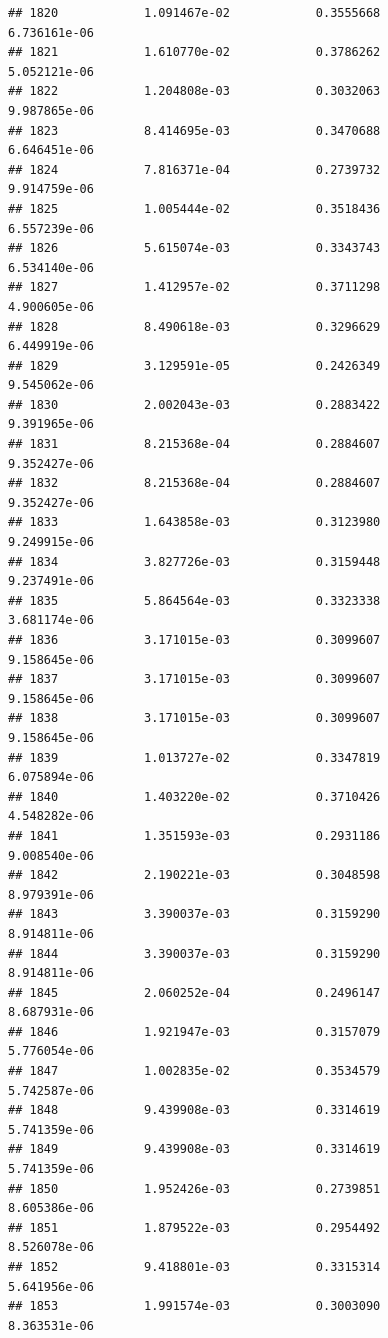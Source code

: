 \documentclass[
]{article}
\begin{document}
\begin{verbatim}
## 1820            1.091467e-02            0.3555668            6.736161e-06
## 1821            1.610770e-02            0.3786262            5.052121e-06
## 1822            1.204808e-03            0.3032063            9.987865e-06
## 1823            8.414695e-03            0.3470688            6.646451e-06
## 1824            7.816371e-04            0.2739732            9.914759e-06
## 1825            1.005444e-02            0.3518436            6.557239e-06
## 1826            5.615074e-03            0.3343743            6.534140e-06
## 1827            1.412957e-02            0.3711298            4.900605e-06
## 1828            8.490618e-03            0.3296629            6.449919e-06
## 1829            3.129591e-05            0.2426349            9.545062e-06
## 1830            2.002043e-03            0.2883422            9.391965e-06
## 1831            8.215368e-04            0.2884607            9.352427e-06
## 1832            8.215368e-04            0.2884607            9.352427e-06
## 1833            1.643858e-03            0.3123980            9.249915e-06
## 1834            3.827726e-03            0.3159448            9.237491e-06
## 1835            5.864564e-03            0.3323338            3.681174e-06
## 1836            3.171015e-03            0.3099607            9.158645e-06
## 1837            3.171015e-03            0.3099607            9.158645e-06
## 1838            3.171015e-03            0.3099607            9.158645e-06
## 1839            1.013727e-02            0.3347819            6.075894e-06
## 1840            1.403220e-02            0.3710426            4.548282e-06
## 1841            1.351593e-03            0.2931186            9.008540e-06
## 1842            2.190221e-03            0.3048598            8.979391e-06
## 1843            3.390037e-03            0.3159290            8.914811e-06
## 1844            3.390037e-03            0.3159290            8.914811e-06
## 1845            2.060252e-04            0.2496147            8.687931e-06
## 1846            1.921947e-03            0.3157079            5.776054e-06
## 1847            1.002835e-02            0.3534579            5.742587e-06
## 1848            9.439908e-03            0.3314619            5.741359e-06
## 1849            9.439908e-03            0.3314619            5.741359e-06
## 1850            1.952426e-03            0.2739851            8.605386e-06
## 1851            1.879522e-03            0.2954492            8.526078e-06
## 1852            9.418801e-03            0.3315314            5.641956e-06
## 1853            1.991574e-03            0.3003090            8.363531e-06

\end{verbatim}
\end{document}
